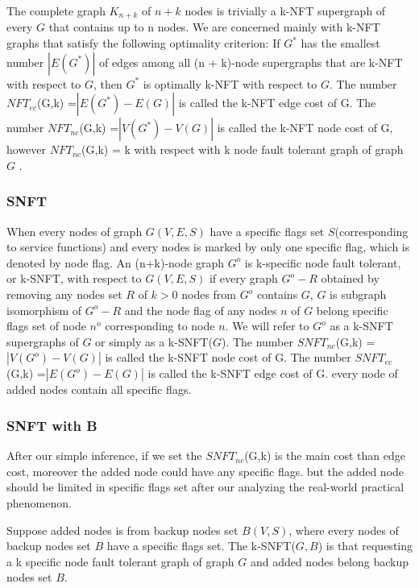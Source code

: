 The complete graph $K_{n+k}$ of $n + k$ nodes is trivially a k-NFT supergraph of every $G$ that contains up to n nodes. We are concerned mainly with k-NFT graphs that satisfy the following optimality criterion: If $G^*$ has the smallest number $|E(G^*)|$ of edges among all (n + k)-node supergraphs that are k-NFT with respect to $G$, then $G^*$ is optimally k-NFT with respect to $G$. The number $NFT_{ec}$(G,k) =$|E(G^*)-E(G)|$ is called the k-NFT edge cost of G. The number $NFT_{nc}$(G,k) =$|V(G^*)-V(G)|$ is called the k-NFT node cost of G, however $NFT_{nc}$(G,k) = k with respect with k node fault tolerant graph of graph $G$ .
\subsubsection{SNFT}
When every nodes of graph $G(V,E,S)$ have a specific flags set $S$(corresponding to service functions) and every nodes is marked by only one specific flag, which is denoted by node flag. An (n+k)-node graph $G^o$ is k-specific node fault tolerant, or k-SNFT, with respect to $G(V,E,S)$ if every graph $G^o-R$ obtained by removing any nodes set $R$ of $k>0$ nodes from $G^o$ contains $G$, $G$ is subgraph isomorphism of $G^o-R$ and the node flag of any nodes $n$ of $G$ belong specific flags set of node $n^o$ corresponding to node $n$. We will refer to $G^o$ as a k-SNFT supergraphs of $G$ or simply as a k-SNFT($G$). The number $SNFT_{nc}$(G,k) =$|V(G^o)-V(G)|$ is called the k-SNFT node cost of G. The number $SNFT_{ec}$(G,k) =$|E(G^o)-E(G)|$ is called the k-SNFT edge cost of G. every node of added nodes contain all specific flags.
\subsubsection{SNFT with B}
After our simple inference, if we set the $SNFT_{nc}$(G,k) is the main cost than edge cost, moreover the added node could have any specific flags. but the added node should be limited in specific flags set after our analyzing the real-world practical phenomenon.

Suppose added nodes is from backup nodes set $B(V,S)$, where every nodes of backup nodes set $B$ have a specific flags set. The k-SNFT($G,B$) is that requesting a k specific node fault tolerant graph of graph $G$ and added nodes belong backup nodes set $B$.



